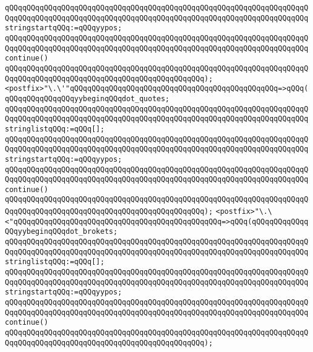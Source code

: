 \verb|qQQqqQQqqQQqqQQqqQQqqQQqqQQqqQQqqQQqqQQqqQQqqQQqqQQqqQQqqQQqqQQqqQQqqQQqqQQqqQQqqQQqqQQqqQQqqQQqqQQqqQQqqQQqqQQqqQQqqQQqqQQqqQQqqQQqqQQqqQQqstringstartqQQq:=qQQqyypos;|\newline
\verb|qQQqqQQqqQQqqQQqqQQqqQQqqQQqqQQqqQQqqQQqqQQqqQQqqQQqqQQqqQQqqQQqqQQqqQQqqQQqqQQqqQQqqQQqqQQqqQQqqQQqqQQqqQQqqQQqqQQqqQQqqQQqqQQqqQQqqQQqqQQqcontinue()|\newline
\verb|qQQqqQQqqQQqqQQqqQQqqQQqqQQqqQQqqQQqqQQqqQQqqQQqqQQqqQQqqQQqqQQqqQQqqQQqqQQqqQQqqQQqqQQqqQQqqQQqqQQqqQQqqQQqqQQqqQQq);|\newline
\newline
\verb|<postfix>"\.\'"qQQqqQQqqQQqqQQqqQQqqQQqqQQqqQQqqQQqqQQqqQQqqQQq=>qQQq(qQQqqQQqqQQqqQQqyybeginqQQqdot_quotes;|\newline
\verb|qQQqqQQqqQQqqQQqqQQqqQQqqQQqqQQqqQQqqQQqqQQqqQQqqQQqqQQqqQQqqQQqqQQqqQQqqQQqqQQqqQQqqQQqqQQqqQQqqQQqqQQqqQQqqQQqqQQqqQQqqQQqqQQqqQQqqQQqqQQqstringlistqQQq:=qQQq[];|\newline
\verb|qQQqqQQqqQQqqQQqqQQqqQQqqQQqqQQqqQQqqQQqqQQqqQQqqQQqqQQqqQQqqQQqqQQqqQQqqQQqqQQqqQQqqQQqqQQqqQQqqQQqqQQqqQQqqQQqqQQqqQQqqQQqqQQqqQQqqQQqqQQqstringstartqQQq:=qQQqyypos;|\newline
\verb|qQQqqQQqqQQqqQQqqQQqqQQqqQQqqQQqqQQqqQQqqQQqqQQqqQQqqQQqqQQqqQQqqQQqqQQqqQQqqQQqqQQqqQQqqQQqqQQqqQQqqQQqqQQqqQQqqQQqqQQqqQQqqQQqqQQqqQQqqQQqcontinue()|\newline
\verb|qQQqqQQqqQQqqQQqqQQqqQQqqQQqqQQqqQQqqQQqqQQqqQQqqQQqqQQqqQQqqQQqqQQqqQQqqQQqqQQqqQQqqQQqqQQqqQQqqQQqqQQqqQQqqQQqqQQq);|\newline
\newline
\verb|<postfix>"\.\<"qQQqqQQqqQQqqQQqqQQqqQQqqQQqqQQqqQQqqQQqqQQqqQQq=>qQQq(qQQqqQQqqQQqqQQqyybeginqQQqdot_brokets;|\newline
\verb|qQQqqQQqqQQqqQQqqQQqqQQqqQQqqQQqqQQqqQQqqQQqqQQqqQQqqQQqqQQqqQQqqQQqqQQqqQQqqQQqqQQqqQQqqQQqqQQqqQQqqQQqqQQqqQQqqQQqqQQqqQQqqQQqqQQqqQQqqQQqstringlistqQQq:=qQQq[];|\newline
\verb|qQQqqQQqqQQqqQQqqQQqqQQqqQQqqQQqqQQqqQQqqQQqqQQqqQQqqQQqqQQqqQQqqQQqqQQqqQQqqQQqqQQqqQQqqQQqqQQqqQQqqQQqqQQqqQQqqQQqqQQqqQQqqQQqqQQqqQQqqQQqstringstartqQQq:=qQQqyypos;|\newline
\verb|qQQqqQQqqQQqqQQqqQQqqQQqqQQqqQQqqQQqqQQqqQQqqQQqqQQqqQQqqQQqqQQqqQQqqQQqqQQqqQQqqQQqqQQqqQQqqQQqqQQqqQQqqQQqqQQqqQQqqQQqqQQqqQQqqQQqqQQqqQQqcontinue()|\newline
\verb|qQQqqQQqqQQqqQQqqQQqqQQqqQQqqQQqqQQqqQQqqQQqqQQqqQQqqQQqqQQqqQQqqQQqqQQqqQQqqQQqqQQqqQQqqQQqqQQqqQQqqQQqqQQqqQQqqQQq);|\newline
